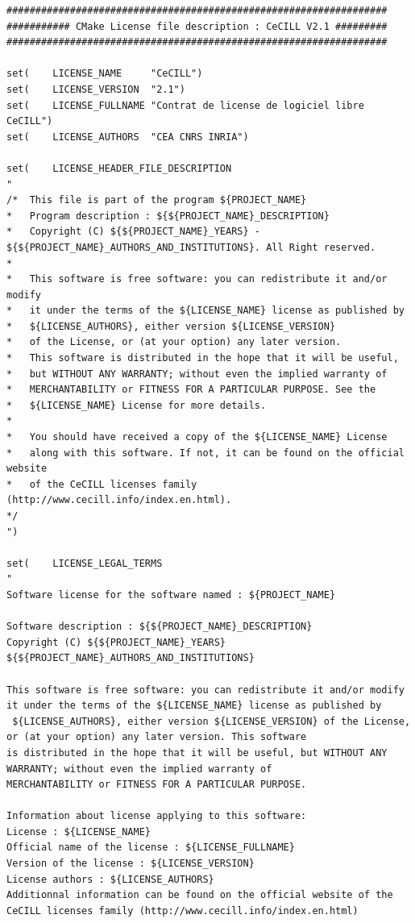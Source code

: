 \documentclass[12pt,a4paper]{article}
\begin{document}
\begin{verbatim}
##################################################################
########### CMake License file description : CeCILL V2.1 #########
##################################################################

set(	LICENSE_NAME     "CeCILL")
set(	LICENSE_VERSION  "2.1")
set(	LICENSE_FULLNAME "Contrat de license de logiciel libre CeCILL")
set(	LICENSE_AUTHORS  "CEA CNRS INRIA")

set(	LICENSE_HEADER_FILE_DESCRIPTION 
"
/* 	This file is part of the program ${PROJECT_NAME}
*  	Program description : ${${PROJECT_NAME}_DESCRIPTION}
*  	Copyright (C) ${${PROJECT_NAME}_YEARS} - ${${PROJECT_NAME}_AUTHORS_AND_INSTITUTIONS}. All Right reserved.
*
*	This software is free software: you can redistribute it and/or modify
*	it under the terms of the ${LICENSE_NAME} license as published by
*	${LICENSE_AUTHORS}, either version ${LICENSE_VERSION} 
*	of the License, or (at your option) any later version.
*	This software is distributed in the hope that it will be useful,
*	but WITHOUT ANY WARRANTY; without even the implied warranty of
*	MERCHANTABILITY or FITNESS FOR A PARTICULAR PURPOSE. See the
*	${LICENSE_NAME} License for more details.
*
*	You should have received a copy of the ${LICENSE_NAME} License
*	along with this software. If not, it can be found on the official website 
*	of the CeCILL licenses family (http://www.cecill.info/index.en.html).
*/
")

set(	LICENSE_LEGAL_TERMS
"
Software license for the software named : ${PROJECT_NAME}

Software description : ${${PROJECT_NAME}_DESCRIPTION}
Copyright (C) ${${PROJECT_NAME}_YEARS} ${${PROJECT_NAME}_AUTHORS_AND_INSTITUTIONS}

This software is free software: you can redistribute it and/or modify it under the terms of the ${LICENSE_NAME} license as published by
 ${LICENSE_AUTHORS}, either version ${LICENSE_VERSION} of the License, or (at your option) any later version. This software 
is distributed in the hope that it will be useful, but WITHOUT ANY WARRANTY; without even the implied warranty of 
MERCHANTABILITY or FITNESS FOR A PARTICULAR PURPOSE. 

Information about license applying to this software:
License : ${LICENSE_NAME}
Official name of the license : ${LICENSE_FULLNAME}
Version of the license : ${LICENSE_VERSION}
License authors : ${LICENSE_AUTHORS}
Additionnal information can be found on the official website of the CeCILL licenses family (http://www.cecill.info/index.en.html)


\end{verbatim}
\end{document}
